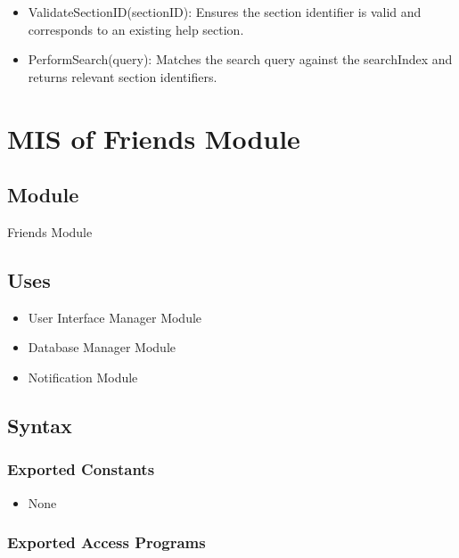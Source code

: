\documentclass[12pt, titlepage]{article}
\begin{document}
\begin{itemize}
  \item ValidateSectionID(sectionID): Ensures the section identifier is valid and corresponds to an existing help section.
  \item PerformSearch(query): Matches the search query against the searchIndex and returns relevant section identifiers.
\end{itemize}


\newpage

\section{MIS of Friends Module} \label{Module_Friends}

\subsection{Module}

Friends Module

\subsection{Uses}

\begin{itemize}
  \item User Interface Manager Module
  \item Database Manager Module
  \item Notification Module
\end{itemize}

\subsection{Syntax}

\subsubsection{Exported Constants}

\begin{itemize}
  \item None
\end{itemize}

\subsubsection{Exported Access Programs}
\end{document}
